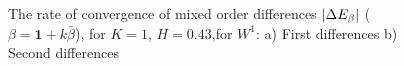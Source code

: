 \documentclass[11pt]{article}
\begin{document}
\begin{figure}[h!]
	
	\caption{The rate of convergence of  mixed order differences $\left\lvert\Delta E_{\beta}\right\rvert$ ($\beta=\mathbf{1}+k \bar{\beta}$), for $K=1$, $H=0.43$,for $W^1$: a) First differences  b) Second differences }
	\label{fig:mixed_diff_comp_K_1_H_043_wihtout_change_measure,linear}
\end{figure}


\FloatBarrier






%
%	
%	
%	
%
%
%
%
%
%
%	
%
\end{document}
